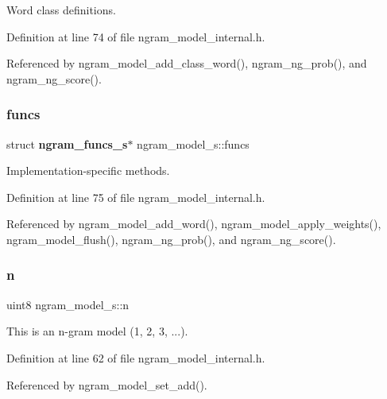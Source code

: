 Word class definitions. 



Definition at line 74 of file ngram\+\_\+model\+\_\+internal.\+h.



Referenced by ngram\+\_\+model\+\_\+add\+\_\+class\+\_\+word(), ngram\+\_\+ng\+\_\+prob(), and ngram\+\_\+ng\+\_\+score().

\mbox{\label{structngram__model__s_ad3d9d8ad9773f958a89534220eda6fb9}} 
\subsubsection{funcs}
{\footnotesize\ttfamily struct \textbf{ ngram\+\_\+funcs\+\_\+s}$\ast$ ngram\+\_\+model\+\_\+s\+::funcs}



Implementation-\/specific methods. 



Definition at line 75 of file ngram\+\_\+model\+\_\+internal.\+h.



Referenced by ngram\+\_\+model\+\_\+add\+\_\+word(), ngram\+\_\+model\+\_\+apply\+\_\+weights(), ngram\+\_\+model\+\_\+flush(), ngram\+\_\+ng\+\_\+prob(), and ngram\+\_\+ng\+\_\+score().

\mbox{\label{structngram__model__s_a3c87bc1b678662a2c8930b3b8c33a80f}} 
\subsubsection{n}
{\footnotesize\ttfamily uint8 ngram\+\_\+model\+\_\+s\+::n}



This is an n-\/gram model (1, 2, 3, ...). 



Definition at line 62 of file ngram\+\_\+model\+\_\+internal.\+h.



Referenced by ngram\+\_\+model\+\_\+set\+\_\+add().

\mbox{\label{structngram__model__s_a710daed84ee676f79dcbf510fca238e8}} 
